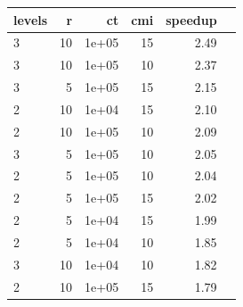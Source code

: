 \begin{tabular}{l|rrrrr}
\hline
levels & r & ct & cmi & speedup \\
\hline
3 & 10 & 1e+05 & 15 & 2.49 \\
3 & 10 & 1e+05 & 10 & 2.37 \\
3 & 5 & 1e+05 & 15 & 2.15 \\
2 & 10 & 1e+04 & 15 & 2.10 \\
2 & 10 & 1e+05 & 10 & 2.09 \\
3 & 5 & 1e+05 & 10 & 2.05 \\
2 & 5 & 1e+05 & 10 & 2.04 \\
2 & 5 & 1e+05 & 15 & 2.02 \\
2 & 5 & 1e+04 & 15 & 1.99 \\
2 & 5 & 1e+04 & 10 & 1.85 \\
3 & 10 & 1e+04 & 10 & 1.82 \\
2 & 10 & 1e+05 & 15 & 1.79 \\
\hline
\end{tabular}
